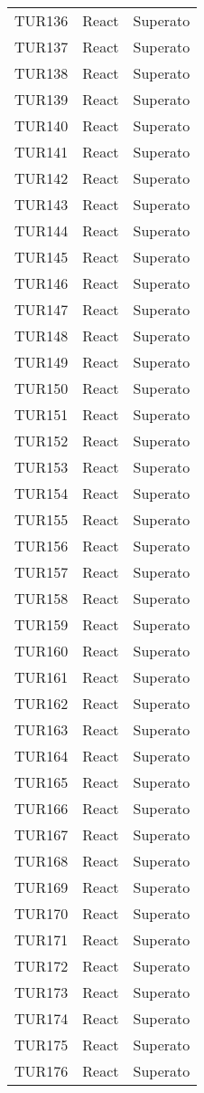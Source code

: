 \documentclass[PianoDiQualifica.tex]{subfiles}
\begin{document}
\begin{longtable}[H]{P{2cm}P{8.5cm}P{3cm}}
	TUR136 & React & Superato \\ 
	TUR137 & React & Superato \\ 
	TUR138 & React & Superato \\ 
	TUR139 & React & Superato \\ 
	TUR140 & React & Superato \\ 
	TUR141 & React & Superato \\ 
	TUR142 & React & Superato \\ 
	TUR143 & React & Superato \\ 
	TUR144 & React & Superato \\ 
	TUR145 & React & Superato \\ 
	TUR146 & React & Superato \\ 
	TUR147 & React & Superato \\ 
	TUR148 & React & Superato \\ 
	TUR149 & React & Superato \\ 
	TUR150 & React & Superato \\ 
	TUR151 & React & Superato \\ 
	TUR152 & React & Superato \\ 
	TUR153 & React & Superato \\ 
	TUR154 & React & Superato \\ 
	TUR155 & React & Superato \\ 
	TUR156 & React & Superato \\ 
	TUR157 & React & Superato \\ 
	TUR158 & React & Superato \\ 
	TUR159 & React & Superato \\ 
	TUR160 & React & Superato \\ 
	TUR161 & React & Superato \\ 
	TUR162 & React & Superato \\ 
	TUR163 & React & Superato \\ 
	TUR164 & React & Superato \\ 
	TUR165 & React & Superato \\ 
	TUR166 & React & Superato \\ 
	TUR167 & React & Superato \\ 
	TUR168 & React & Superato \\ 
	TUR169 & React & Superato \\ 
	TUR170 & React & Superato \\ 
	TUR171 & React & Superato \\ 
	TUR172 & React & Superato \\ 
	TUR173 & React & Superato \\ 
	TUR174 & React & Superato \\ 
	TUR175 & React & Superato \\ 
	TUR176 & React & Superato \\


\end{longtable}
\end{document}
